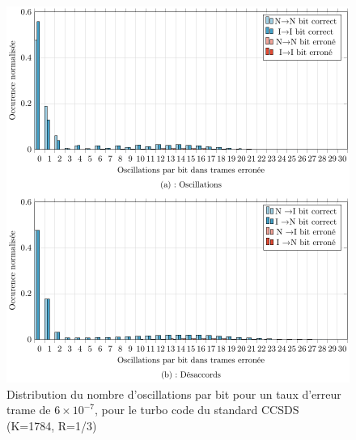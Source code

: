 \begin{figure}[!ht]
	\centering
	\includegraphics[width=.9\textwidth]{main/ch2_fig/tikz/d_ccsds_610-7.pdf}
	\caption{Distribution du nombre d'oscillations par bit pour un taux d'erreur trame de $6\times10^{-7}$, pour le turbo code du standard CCSDS (K=1784, R=1/3)\label{fig:d2_ccsds}}
\end{figure}


